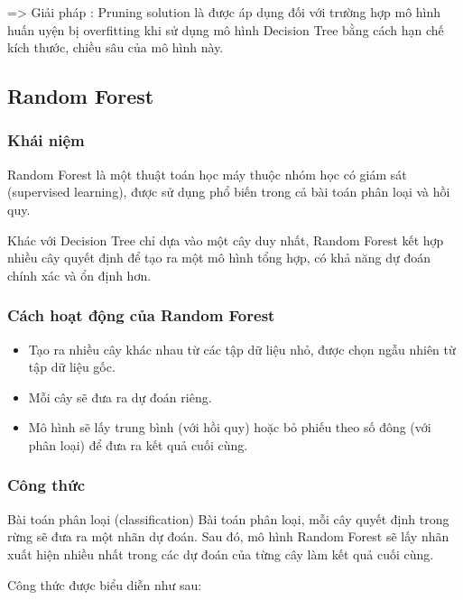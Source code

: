 \documentclass[
]{article}
\providecommand{\tightlist}{%
  \setlength{\itemsep}{0pt}\setlength{\parskip}{0pt}}
\begin{document}
=\textgreater{} Giải pháp : Pruning solution là được áp dụng đối với
trường hợp mô hình huấn uyện bị overfitting khi sử dụng mô hình Decision
Tree bằng cách hạn chế kích thước, chiều sâu của mô hình này.

\subsection{Random Forest}\label{random-forest}

\subsubsection{Khái niệm}\label{khuxe1i-niux1ec7m-4}

Random Forest là một thuật toán học máy thuộc nhóm học có giám sát
(supervised learning), được sử dụng phổ biến trong cả bài toán phân loại
và hồi quy.

Khác với Decision Tree chỉ dựa vào một cây duy nhất, Random Forest kết
hợp nhiều cây quyết định để tạo ra một mô hình tổng hợp, có khả năng dự
đoán chính xác và ổn định hơn.

\subsubsection{Cách hoạt động của Random
Forest}\label{cuxe1ch-houx1ea1t-ux111ux1ed9ng-cux1ee7a-random-forest}

\begin{itemize}
\tightlist
\item
  Tạo ra nhiều cây khác nhau từ các tập dữ liệu nhỏ, được chọn ngẫu
  nhiên từ tập dữ liệu gốc.
\item
  Mỗi cây sẽ đưa ra dự đoán riêng.
\item
  Mô hình sẽ lấy trung bình (với hồi quy) hoặc bỏ phiếu theo số đông
  (với phân loại) để đưa ra kết quả cuối cùng.
\end{itemize}

\subsubsection{Công thức}\label{cuxf4ng-thux1ee9c-1}

Bài toán phân loại (classification) Bài toán phân loại, mỗi cây quyết
định trong rừng sẽ đưa ra một nhãn dự đoán. Sau đó, mô hình Random
Forest sẽ lấy nhãn xuất hiện nhiều nhất trong các dự đoán của từng cây
làm kết quả cuối cùng.

Công thức được biểu diễn như sau:
\end{document}
